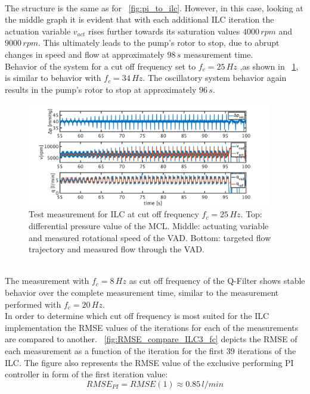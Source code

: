 \\The structure is the same as for \figurename~\ref{fig:pi_to_ilc}. However, in this case, looking at the middle graph it is evident that with each additional ILC iteration the actuation variable $v_{act}$ rises further towards its saturation values $4000\,rpm$ and $9000\,rpm$. This ultimately leads to the pump's rotor to stop, due to abrupt changes in speed and flow at approximately $98\,s$ measurement time.
\\Behavior of the system for a cut off frequency set to $f_c=25\,Hz$ ,as shown in \figurename~\ref{fig:pi_to_ilc_fc_25}, is similar to behavior with $f_c=34\,Hz$. The oscillatory system behavior again results in the pump's rotor to stop at approximately $96\,s$.
\begin{figure}[ht]
  \centering
  \includegraphics[width=0.95\textwidth]{images/chapt_5/ILC/pi_to_ilc_fc_25.pdf}
  \caption[Test measurement for ILC at cut off frequency $f_c=25\,Hz$]{Test measurement for ILC at cut off frequency $f_c=25\,Hz$. Top: differential pressure value of the MCL. Middle: actuating variable and measured rotational speed of the VAD. Bottom: targeted flow trajectory and measured flow through the VAD.}
  \label{fig:pi_to_ilc_fc_25}
\end{figure}
\\The measurement with $f_c=8\,Hz$ as cut off frequency of the Q-Filter shows stable behavior over the complete measurement time, similar to the measurement performed with $f_c=20\,Hz$.
\\In order to determine which cut off frequency is most suited for the ILC implementation the RMSE values of the iterations for each of the measurements are compared to another. \figurename~\ref{fig:RMSE_compare_ILC3_fc} depicts the RMSE of each measurement as a function of the iteration for the first 39 iterations of the ILC. The figure also represents the RMSE value of the exclusive performing PI controller in form of the first iteration value:
\begin{equation}
  RMSE_{PI}=RMSE(1)\approx 0.85\,l/min
\end{equation}

